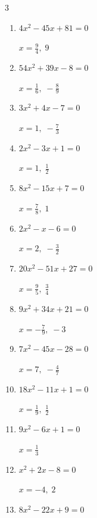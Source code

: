 \begin{multicols}{3}
\begin{enumerate}
        $\displaystyle x=\frac{6}{7},\; -\frac{7}{6}$

  \item $4x^{2}-45x+81=0$

        $\displaystyle x=\frac{9}{4},\; 9$

  \item $54x^{2}+39x-8=0$

        $\displaystyle x=\frac{1}{6},\; -\frac{8}{9}$

  \item $3x^{2}+4x-7=0$

        $\displaystyle x=1,\; -\frac{7}{3}$

  \item $2x^{2}-3x+1=0$

        $\displaystyle x=1,\; \frac{1}{2}$

\columnbreak %

\resetques

  \item $8x^{2}-15x+7=0$

        $\displaystyle x=\frac{7}{8},\; 1$

  \item $2x^{2}-x-6=0$

        $\displaystyle x=2,\; -\frac{3}{2}$

  \item $20x^{2}-51x+27=0$

        $\displaystyle x=\frac{9}{5},\; \frac{3}{4}$

  \item $9x^{2}+34x+21=0$

        $\displaystyle x=-\frac{7}{9},\; -3$

  \item $7x^{2}-45x-28=0$

        $\displaystyle x=7,\; -\frac{4}{7}$

  \item $18x^{2}-11x+1=0$

        $\displaystyle x=\frac{1}{9},\; \frac{1}{2}$

  \item $9x^{2}-6x+1=0$

        $\displaystyle x=\frac{1}{3}$

  \item $x^{2}+2x-8=0$

        $\displaystyle x=-4,\; 2$

  \item $8x^{2}-22x+9=0$


\end{enumerate}
\end{multicols}
